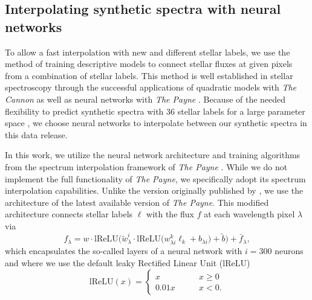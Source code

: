\documentclass[
  journal=pasa,
  manuscript=research-paper, %
  year=2024,
  volume=37
]{cup-journal}
\begin{document}
\subsection{Interpolating synthetic spectra with neural networks} \label{sec:interpolating_synthetic_spectra_with_neural_networks}

To allow a fast interpolation with new and different stellar labels, we use the method of training descriptive models to connect stellar fluxes at given pixels from a combination of stellar labels. This method is well established in stellar spectroscopy through the successful applications of quadratic models with \textit{The Cannon} \citep[see e.g.][]{Ness2015, Ness2016, Casey2016, Casey2017, Ho2017, Buder2018} as well as neural networks with \textit{The Payne} \citep[see e.g.][]{Ting2019, Xiang2019, Xiang2021}. Because of the needed flexibility to predict synthetic spectra with 36 stellar labels for a large parameter space \citep[for a detailled discussion of advantages of neural networks over quadratic models see][]{Ting2019}, we choose neural networks to interpolate between our synthetic spectra in this data release.

In this work, we utilize the neural network architecture and training algorithms from the spectrum interpolation framework of \textit{The Payne} \citep{Ting2019}. While we do not implement the full functionality of \textit{The Payne}, we specifically adopt its spectrum interpolation capabilities. Unlike the version originally published by \citet{Ting2019}, we use the architecture of the latest available version of \textit{The Payne}. This modified architecture connects stellar labels $\boldsymbol{\ell}$ with the flux $f$ at each wavelength pixel $\lambda$ via
\begin{equation}
f_\lambda = w \cdot \mathrm{lReLU} \bigg( \tilde{w}_\lambda^i \cdot \mathrm{lReLU}  \Big( w^k_{\lambda i} \ell_k + b_{\lambda i} \Big) + \tilde{b} \bigg) + \bar{f}_\lambda,
\label{eq:neural_network_function}
\end{equation}
which encapsulates the so-called layers of a neural network with $i = 300$ neurons and where we use the default leaky Rectified Linear Unit ($\mathrm{lReLU}$)
\begin{equation}
    \mathrm{lReLU} (x) =  \begin{cases}
        x \qquad &x \geq 0 \\
        0.01 x \qquad &x < 0.
    \end{cases}
\end{equation}
\end{document}
